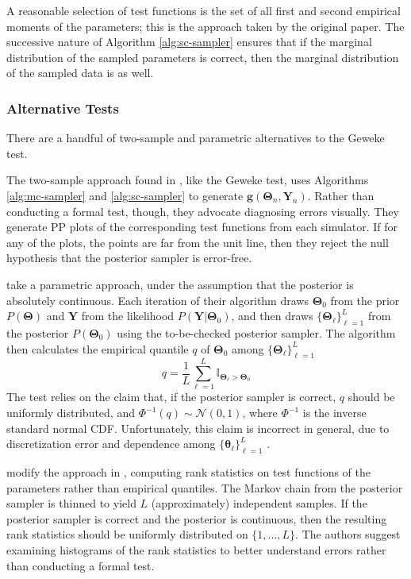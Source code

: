 \documentclass[a4paper,11pt]{article}
\begin{document}
A reasonable selection of test functions is the set of all first and second empirical moments of the parameters; this is the approach taken by the original paper. The successive nature of Algorithm \ref{alg:sc-sampler} ensures that if the marginal distribution of the sampled parameters is correct, then the marginal distribution of the sampled data is as well.

\subsubsection{Alternative Tests}
There are a handful of two-sample and parametric alternatives to the Geweke test.

The two-sample approach found in \cite{grosse_testing_2014}, like the Geweke test, uses Algorithms \ref{alg:mc-sampler} and \ref{alg:sc-sampler} to generate $\mathbf{g}(\mathbf{\Theta}_{n}, \mathbf{Y}_{n})$. Rather than conducting a formal test, though, they advocate diagnosing errors visually. They generate PP plots of the corresponding test functions from each simulator. If for any of the plots, the points are far from the unit line, then they reject the null hypothesis that the posterior sampler is error-free.

\cite{cook_validation_2006} take a parametric approach, under the assumption that the posterior is absolutely continuous. Each iteration of their algorithm draws $\mathbf{\Theta}_{0}$ from the prior $P(\mathbf{\Theta})$ and $\mathbf{Y}$ from the likelihood $P(\mathbf{Y}|\mathbf{\Theta}_{0})$, and then draws $\{\mathbf{\Theta}_{\ell}\}_{\ell=1}^{L}$ from the posterior $P(\mathbf{\Theta}_{0})$ using the to-be-checked posterior sampler. The algorithm then calculates the empirical quantile $q$ of $\mathbf{\Theta}_{0}$ among $\{\mathbf{\Theta}_{\ell}\}_{\ell=1}^{L}$
$$
q = \frac{1}{L} \sum_{\ell=1}^{L} \mathbb{I}_{\mathbf{\Theta}_{\ell} > \mathbf{\Theta}_{0}}
$$
The test relies on the claim that, if the posterior sampler is correct, $q$ should be uniformly distributed, and $\Phi^{-1}(q) \sim \mathcal{N}(0,1)$, where $\Phi^{-1}$ is the inverse standard normal CDF. Unfortunately, this claim is incorrect in general, due to discretization error and dependence among $\{\mathbf{\theta}_{\ell}\}_{\ell=1}^{L}$ \cite{gelman_correction_2017}.

\cite{talts_validating_2018} modify the approach in \cite{cook_validation_2006}, computing rank statistics on test functions of the parameters rather than empirical quantiles. The Markov chain from the posterior sampler is thinned to yield $L$ (approximately) independent samples. If the posterior sampler is correct and the posterior is continuous, then the resulting rank statistics should be uniformly distributed on $\{1, \ldots, L\}$. The authors suggest examining histograms of the rank statistics to better understand errors rather than conducting a formal test.
\end{document}
